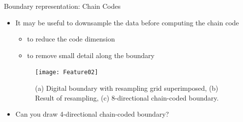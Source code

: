 \begin{frame}{Boundary representation: Chain Codes}
\begin{itemize}
\item It may be useful to downsample the data before computing the chain code
\begin{itemize}
\item to reduce the code dimension
\item to remove small detail along the boundary
\end{itemize}
\begin{figure}
\texttt{[image: Feature02]}
\caption{(a) Digital boundary with resampling grid superimposed, (b) Result of resampling, (c) 8-directional chain-coded boundary.}
\end{figure}
\item Can you draw 4-directional chain-coded boundary?
\end{itemize}
\end{frame}

